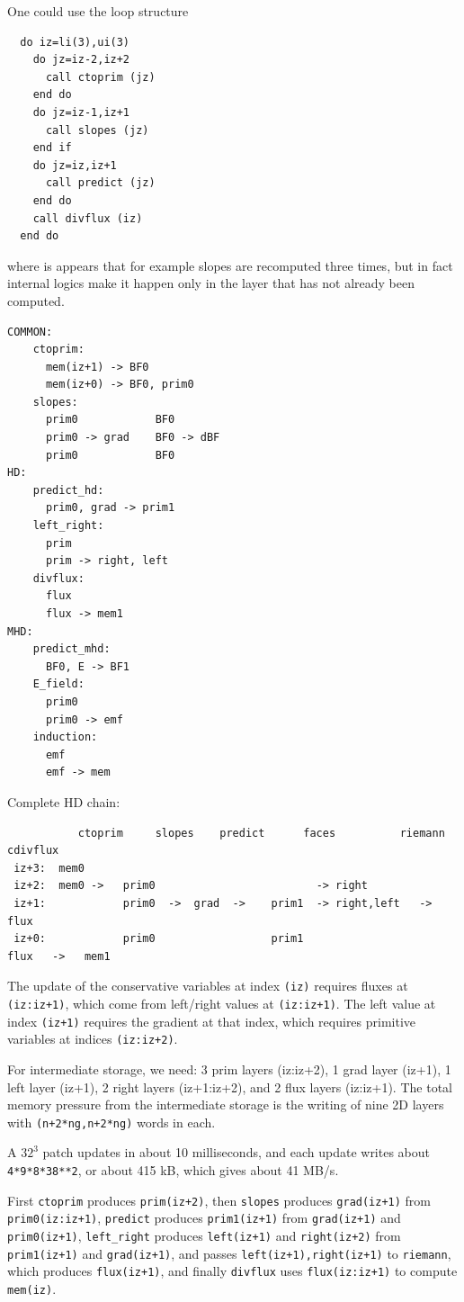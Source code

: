 \documentclass[paper=a4,fontsize=11pt]{scrartcl}
\numberwithin{equation}{section}		%
\numberwithin{figure}{section}			%
\numberwithin{table}{section}				%
\begin{document}
One could use the loop structure
\begin{verbatim}
  do iz=li(3),ui(3)
    do jz=iz-2,iz+2
      call ctoprim (jz)
    end do
    do jz=iz-1,iz+1
      call slopes (jz)
    end if
    do jz=iz,iz+1
      call predict (jz)
    end do
    call divflux (iz)
  end do
\end{verbatim}
where is appears that for example slopes are recomputed three times, but in fact internal logics make it happen only in the layer that has not already been computed.
\begin{verbatim}
COMMON:
    ctoprim:
      mem(iz+1) -> BF0
      mem(iz+0) -> BF0, prim0
    slopes:
      prim0            BF0
      prim0 -> grad    BF0 -> dBF
      prim0            BF0
HD:
    predict_hd:
      prim0, grad -> prim1
    left_right:
      prim
      prim -> right, left
    divflux:
      flux
      flux -> mem1
MHD:
    predict_mhd:
      BF0, E -> BF1
    E_field:
      prim0
      prim0 -> emf
    induction:
      emf
      emf -> mem
\end{verbatim}
Complete HD chain:
\begin{verbatim}
           ctoprim     slopes    predict      faces          riemann   cdivflux
 iz+3:  mem0
 iz+2:  mem0 ->   prim0                         -> right
 iz+1:            prim0  ->  grad  ->    prim1  -> right,left   ->  flux 
 iz+0:            prim0                  prim1                      flux   ->   mem1
\end{verbatim}
The update of the conservative variables at index \verb|(iz)| requires fluxes at \verb|(iz:iz+1)|, which come from left/right values at \verb|(iz:iz+1)|.  The left value at index \verb|(iz+1)| requires the gradient at that index, which requires primitive variables at indices \verb|(iz:iz+2)|.

For intermediate storage, we need: 3 prim layers (iz:iz+2), 1 grad layer (iz+1), 1 left layer (iz+1), 2 right layers (iz+1:iz+2), and 2 flux layers (iz:iz+1).  The total memory pressure from the intermediate storage is the writing of nine 2D layers with \verb|(n+2*ng,n+2*ng)| words in each.

A $32^3$ patch updates in about 10 milliseconds, and each update writes about \verb|4*9*8*38**2|, or about 415 kB, which gives about 41 MB/s.

First \verb|ctoprim| produces \verb|prim(iz+2)|, then \verb|slopes| produces \verb|grad(iz+1)| from \verb|prim0(iz:iz+1)|, \verb|predict| produces \verb|prim1(iz+1)| from \verb|grad(iz+1)| and \verb|prim0(iz+1)|, \verb|left_right| produces \verb|left(iz+1)| and \verb|right(iz+2)| from \verb|prim1(iz+1)| and \verb|grad(iz+1)|, and passes \verb|left(iz+1),right(iz+1)| to \verb|riemann|, which produces \verb|flux(iz+1)|, and finally \verb|divflux| uses \verb|flux(iz:iz+1)| to compute \verb|mem(iz)|.
\end{document}
